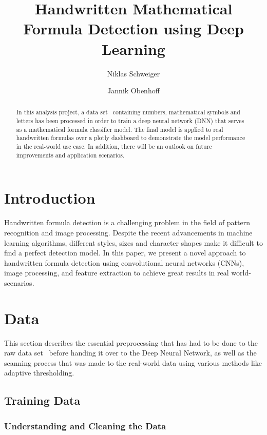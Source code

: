 \documentclass[@CLASSOPTIONS@]{tumarticle}
\title{Handwritten Mathematical Formula Detection using Deep Learning}
\author[affil={1}, email={niklas.schweiger@tum.de}]{Niklas Schweiger}
\author[affil={1}, email={jannik.obenhoff@tum.de}]{Jannik Obenhoff}
\affil{Department of Electrical and Computer Engineering, Technical
  University of Munich, Arcisstr. 21, 80333 Munich, Germany}
\begin{document}
\twocolumn

\maketitle
\begin{abstract}
  In this analysis project, a data set~\cite{kaggledataset} containing numbers, mathematical
  symbols and letters has been processed in order to train a deep neural network (DNN) that
  serves as a mathematical formula classifier model.
  The final model is applied to real handwritten formulas over a plotly dashboard to demonstrate the model
  performance in the real-world use case.
  In addition, there will be an outlook on future improvements and application scenarios.

\end{abstract}

\section{Introduction}

Handwritten formula detection is a challenging problem in the field of pattern recognition and
image processing.
Despite the recent advancements in machine learning algorithms, different styles, sizes and character
shapes make it difficult to find a perfect detection model.
In this paper, we present a novel approach to handwritten formula detection using convolutional
neural networks (CNNs), image processing, and feature extraction to achieve great results
in real world-scenarios.

\section{Data}
\label{sec:measures}

This section describes the essential preprocessing that has had to be done to the raw
data set~\cite{kaggledataset} before handing it over to the Deep Neural Network,
as well as the scanning process that was made to the real-world data using
various methods like adaptive thresholding.

\subsection{Training Data}
\subsubsection{Understanding and Cleaning the Data}
\end{document}
